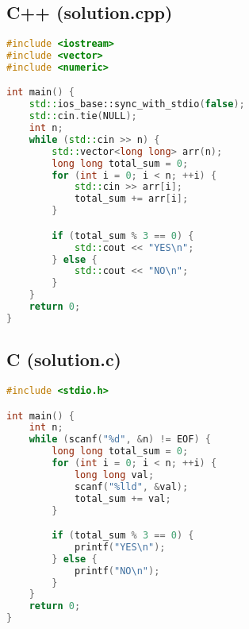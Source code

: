 \documentclass[11pt,a4paper]{article}
\begin{document}
\subsection*{C++ (solution.cpp)}
\begin{lstlisting}[language=C++]
#include <iostream>
#include <vector>
#include <numeric>

int main() {
    std::ios_base::sync_with_stdio(false);
    std::cin.tie(NULL);
    int n;
    while (std::cin >> n) {
        std::vector<long long> arr(n);
        long long total_sum = 0;
        for (int i = 0; i < n; ++i) {
            std::cin >> arr[i];
            total_sum += arr[i];
        }

        if (total_sum % 3 == 0) {
            std::cout << "YES\n";
        } else {
            std::cout << "NO\n";
        }
    }
    return 0;
}
\end{lstlisting}

\subsection*{C (solution.c)}
\begin{lstlisting}[language=C]
#include <stdio.h>

int main() {
    int n;
    while (scanf("%d", &n) != EOF) {
        long long total_sum = 0;
        for (int i = 0; i < n; ++i) {
            long long val;
            scanf("%lld", &val);
            total_sum += val;
        }

        if (total_sum % 3 == 0) {
            printf("YES\n");
        } else {
            printf("NO\n");
        }
    }
    return 0;
}
\end{lstlisting}
\end{document}
